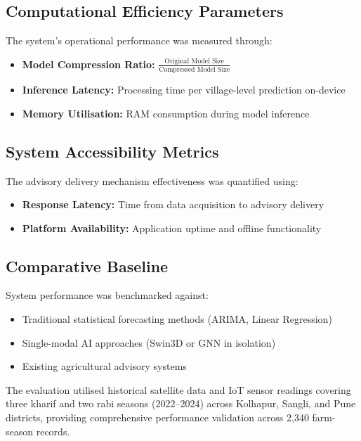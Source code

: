 \subsection*{Computational Efficiency Parameters}
The system's operational performance was measured through:
\begin{itemize}
    \item \textbf{Model Compression Ratio:} $\frac{\text{Original Model Size}}{\text{Compressed Model Size}}$
    \item \textbf{Inference Latency:} Processing time per village-level prediction on-device
    \item \textbf{Memory Utilisation:} RAM consumption during model inference
\end{itemize}

\subsection*{System Accessibility Metrics}
The advisory delivery mechanism effectiveness was quantified using:
\begin{itemize}
    \item \textbf{Response Latency:} Time from data acquisition to advisory delivery
    \item \textbf{Platform Availability:} Application uptime and offline functionality
\end{itemize}

\subsection*{Comparative Baseline}
System performance was benchmarked against:
\begin{itemize}
    \item Traditional statistical forecasting methods (ARIMA, Linear Regression)
    \item Single-modal AI approaches (Swin3D or GNN in isolation)
    \item Existing agricultural advisory systems
\end{itemize}

The evaluation utilised historical satellite data and IoT sensor readings covering three kharif and two rabi seasons (2022--2024) across Kolhapur, Sangli, and Pune districts, providing comprehensive performance validation across 2,340 farm-season records.

